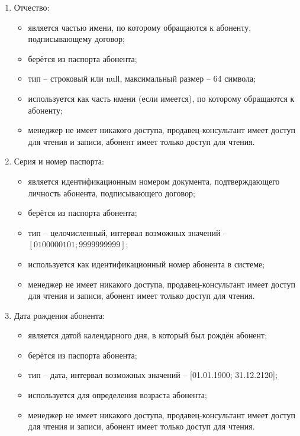 \begin{enumerate}
\begin{enumerate}
        \item Отчество:
        \begin{itemize}
            \item является частью имени, по которому обращаются к абоненту, подписывающему договор;
            \item берётся из паспорта абонента;
            \item тип -- строковый или null, максимальный размер -- 64 символа;
            \item используется как часть имени (если имеется), по которому обращаются к абоненту;
            \item менеджер не имеет никакого доступа, продавец-консультант имеет доступ для чтения и записи, абонент имеет только доступ для чтения.
        \end{itemize}

        \item Серия и номер паспорта:
        \begin{itemize}
            \item является идентификационным номером документа, подтверждающего личность абонента, подписывающего договор;
            \item берётся из паспорта абонента;
            \item тип -- целочисленный, интервал возможных значений -- $[0100000101; 9999999999]$;
            \item используется как идентификационный номер абонента в системе;
            \item менеджер не имеет никакого доступа, продавец-консультант имеет доступ для чтения и записи, абонент имеет только доступ для чтения.
        \end{itemize}

        \item Дата рождения абонента:
        \begin{itemize}
            \item является датой календарного дня, в который был рождён абонент;
            \item берётся из паспорта абонента;
            \item тип -- дата, интервал возможных значений -- [01.01.1900; 31.12.2120];
            \item используется для определения возраста абонента;
            \item менеджер не имеет никакого доступа, продавец-консультант имеет доступ для чтения и записи, абонент имеет только доступ для чтения.
        \end{itemize}


\end{enumerate}
\end{enumerate}
